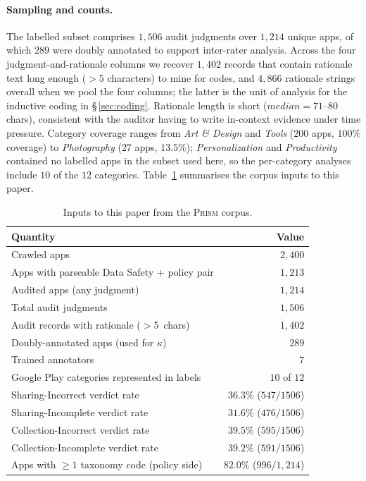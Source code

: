 \documentclass[11pt,a4paper]{article}
\newcommand{\prism}{\textsc{Prism}}
\begin{document}
\paragraph{Sampling and counts.} The labelled subset comprises
$1{,}506$ audit judgments over $1{,}214$ unique apps, of which $289$
were doubly annotated to support inter-rater analysis. Across the four
judgment-and-rationale columns we recover $1{,}402$ records that
contain rationale text long enough ($>5$ characters) to mine for
codes, and $4{,}866$ rationale strings overall when we pool the four
columns; the latter is the unit of analysis for the inductive
coding in \S\,\ref{sec:coding}. Rationale length is short
($median = 71$--$80$ chars), consistent with the auditor having to
write in-context evidence under time pressure. Category coverage
ranges from \emph{Art \& Design} and \emph{Tools} ($200$ apps,
$100\%$ coverage) to \emph{Photography} ($27$ apps, $13.5\%$);
\emph{Personalization} and \emph{Productivity} contained no labelled
apps in the subset used here, so the per-category analyses include
$10$ of the $12$ categories. Table~\ref{tab:corpus-summary}
summarises the corpus inputs to this paper.

\begin{table}[t]
\centering\small
\caption{Inputs to this paper from the \prism{} corpus.}
\label{tab:corpus-summary}
\begin{tabular}{lr}
\toprule
\textbf{Quantity} & \textbf{Value} \\
\midrule
Crawled apps                                   & $2{,}400$ \\
Apps with parseable Data Safety + policy pair  & $1{,}213$ \\
Audited apps (any judgment)                    & $1{,}214$ \\
Total audit judgments                          & $1{,}506$ \\
Audit records with rationale ($>$5~chars)      & $1{,}402$ \\
Doubly-annotated apps (used for $\kappa$)      & $289$ \\
Trained annotators                             & $7$ \\
Google Play categories represented in labels   & $10$ of $12$ \\
\midrule
Sharing-Incorrect verdict rate                 & $36.3\%$ ($547/1506$) \\
Sharing-Incomplete verdict rate                & $31.6\%$ ($476/1506$) \\
Collection-Incorrect verdict rate              & $39.5\%$ ($595/1506$) \\
Collection-Incomplete verdict rate             & $39.2\%$ ($591/1506$) \\
Apps with $\geq 1$ taxonomy code (policy side) & $82.0\%$ ($996/1{,}214$) \\
\bottomrule
\end{tabular}
\end{table}
\end{document}
